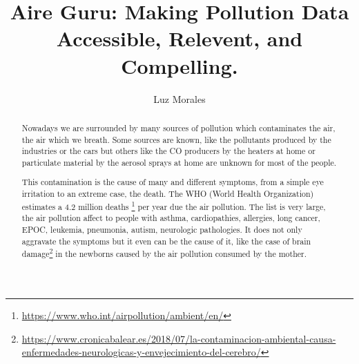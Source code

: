 \documentclass[final,2p,times]{elsarticle}
\begin{document}
\begin{frontmatter}

\title{Aire Guru: Making Pollution Data Accessible, Relevent, and Compelling.}

\author{Luz Morales}
\address{Universidad Internacional de La Rioja}

\begin{abstract}

Nowadays we are surrounded by many sources of pollution which contaminates the air, the air 
which we breath. Some sources are known, like the pollutants produced by
the industries or the cars but others like the CO producers by the heaters at home or 
particulate material by the aerosol sprays at home are unknown for most of the people.

This contamination is the cause of many and different symptoms, from a simple eye irritation 
to an extreme case, the death.
The WHO (World Health Organization) estimates a 4.2 million deaths
\footnote{\url{https://www.who.int/airpollution/ambient/en/}} per year due the air pollution.
The list is very large, the air pollution affect to people with asthma, cardiopathies, allergies,
long cancer, EPOC, leukemia, pneumonia, autism, neurologic pathologies.
It does not only aggravate the symptoms but it even can be the cause of it, like the case of brain
damage\footnote{\url{https://www.cronicabalear.es/2018/07/la-contaminacion-ambiental-causa-
enfermedades-neurologicas-y-envejecimiento-del-cerebro/}} 
in the newborns caused by the air pollution consumed by the mother.


\end{abstract}
\end{frontmatter}
\end{document}
